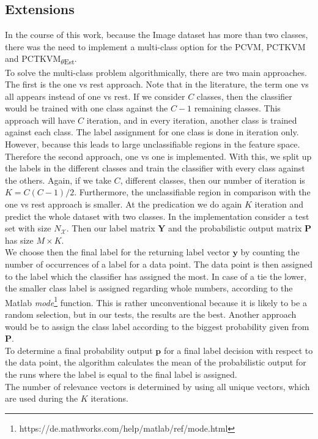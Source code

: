 \subsection{Extensions}\label{InSubSecExt}
In the course of this work, because the Image dataset has more than two classes, there was the need to implement a multi-class option for the \acs{PCVM}, \acs{PCTKVM} and \acs{PCTKVM}\textsubscript{$\theta$Est}.\\
To solve the multi-class problem algorithmically, there are two main approaches.
The first is the one vs rest approach.
Note that in the literature, the term one vs all appears instead of one vs rest.
If we consider $C$ classes, then the classifier would be trained with one class against the $C-1$ remaining classes.
This approach will have $C$ iteration, and in every iteration, another class is trained against each class.
The label assignment for one class is done in iteration only.
However, because this leads to large unclassifiable regions in the feature space.\cite[p. 114-116]{Abe.2010}\newline
Therefore the second approach, one vs one is implemented.
With this, we split up the labels in the different classes and train the classifier with every class against the others.
Again, if we take $C$, different classes, then our number of iteration is $K=C(C-1)/2$.
Furthermore, the unclassifiable region in comparison with the one vs rest approach is smaller.
At the predication we do again $K$ iteration and predict the whole dataset with two classes.\cite[p. 127-128]{Abe.2010}\newline
In the implementation consider a test set with size $N_\mathcal{X}$.
Then our label matrix $\mathbf{Y}$ and the probabilistic output matrix $\mathbf{P}$ has size $M\times K$.\\
We choose then the final label for the returning label vector $\mathbf{y}$ by counting the number of occurrences of a label for a data point.
The data point is then assigned to the label which the classifier has assigned the most.
In case of a tie the lower, the smaller class label is assigned regarding whole numbers, according to the Matlab \textit{mode}\footnote{https://de.mathworks.com/help/matlab/ref/mode.html} function.
This is rather unconventional because it is likely to be a random selection, but in our tests, the results are the best.
Another approach would be to assign the class label according to the biggest probability given from $\mathbf{P}$.\\
To determine a final probability output $\mathbf{p}$ for a final label decision with respect to the data point, the algorithm calculates the mean of the probabilistic output for the runs where the label is equal to the final label is assigned.\\
The number of relevance vectors is determined by using all unique vectors, which are used during the $K$ iterations.

